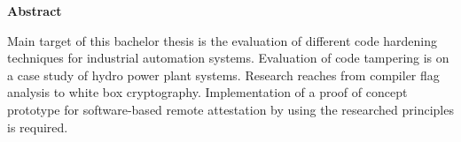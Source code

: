 \documentclass[11pt]{report}
\begin{document}


\newpage
{}
\vspace*{2.2 cm}
{\Large
\noindent
{\bf Abstract}} \\
\vspace*{0.3 cm}

\noindent
Main target of this bachelor thesis is the evaluation of different code hardening techniques for industrial automation systems. Evaluation of code tampering is on a case study of hydro power plant systems. Research reaches from compiler flag analysis to white box cryptography. Implementation of a proof of concept prototype for software-based remote attestation by using the researched principles is required.











\newpage
{}



\end{document}
